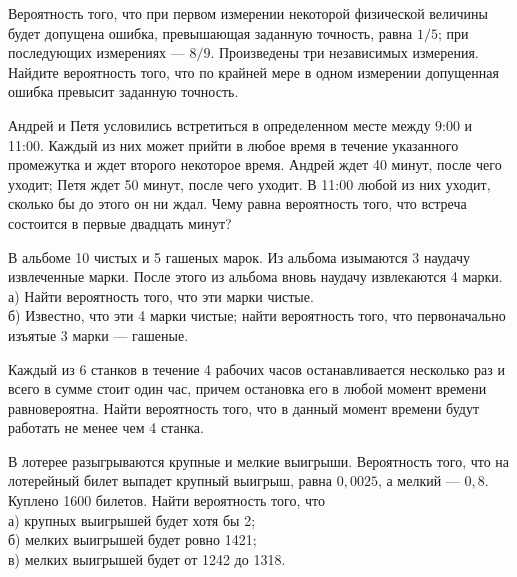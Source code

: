 \newpage\setcounter{zad}{0}



\begin{zkrW}{20}\noindent 
	Вероятность того, что при первом измерении некоторой физической величины будет допущена ошибка, превышающая заданную точность, равна $1/5$; при последующих измерениях --- $8/9$. Произведены три независимых измерения. Найдите вероятность того, что по крайней мере в одном измерении допущенная ошибка превысит заданную точность.
 
\end{zkrW}

\begin{zkrW}{20}\noindent 
	Андрей и Петя условились встретиться в определенном месте между 9:00 и 11:00. Каждый из них может прийти в любое время в течение указанного промежутка и ждет второго некоторое время. Андрей ждет 40 минут, после чего уходит; Петя ждет 50 минут, после чего уходит. В 11:00 любой из них уходит, сколько бы до этого он ни ждал. Чему равна вероятность того, что встреча состоится в первые двадцать минут?
 
\end{zkrW}

\begin{zkrW}{20}\noindent 
	В альбоме 10 чистых и 5 гашеных марок. Из альбома изымаются 3 наудачу извлеченные марки. После этого из альбома вновь наудачу извлекаются 4 марки. \\ \indent а) Найти вероятность того, что эти марки чистые. \\ \indent б) Известно, что эти 4 марки чистые; найти вероятность того, что первоначально изъятые 3 марки --- гашеные.
 
\end{zkrW}

\begin{zkrW}{20}\noindent 
	Каждый из 6 станков в течение 4 рабочих часов останавливается несколько раз и всего в сумме стоит один час, причем остановка его в любой момент времени равновероятна. Найти вероятность того, что в данный момент времени будут работать не менее чем 4 станка.
 
\end{zkrW}

\begin{zkrW}{20}\noindent 
	В лотерее разыгрываются крупные и мелкие выигрыши. Вероятность того, что на лотерейный билет выпадет крупный выигрыш, равна $0{,}0025$, а мелкий --- $0{,}8$. Куплено 1600 билетов. Найти вероятность того, что \\ \indent а) крупных выигрышей будет хотя бы 2; \\ \indent б) мелких выигрышей будет ровно 1421; \\ \indent в) мелких выигрышей будет от 1242 до 1318.
 
\end{zkrW}

